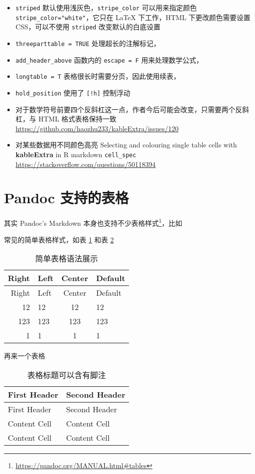 \documentclass[]{book}
\providecommand{\tightlist}{%
  \setlength{\itemsep}{0pt}\setlength{\parskip}{0pt}}
\begin{document}
\begin{itemize}
\tightlist
\item
  \texttt{striped} 默认使用浅灰色，\texttt{stripe\_color} 可以用来指定颜色 \texttt{stripe\_color="white"}，它只在 LaTeX 下工作，HTML 下更改颜色需要设置 CSS，可以不使用 \texttt{striped} 改变默认的白底设置\\
\item
  \texttt{threeparttable\ =\ TRUE} 处理超长的注解标记，
\item
  \texttt{add\_header\_above} 函数内的 \texttt{escape\ =\ F} 用来处理数学公式，
\item
  \texttt{longtable\ =\ T} 表格很长时需要分页，因此使用续表，
\item
  \texttt{hold\_position} 使用了 \texttt{{[}!h{]}} 控制浮动
\item
  对于数学符号前要四个反斜杠这一点，作者今后可能会改变，只需要两个反斜杠，与 HTML 格式表格保持一致 \url{https://github.com/haozhu233/kableExtra/issues/120}
\item
  对某些数据用不同颜色高亮
  Selecting and colouring single table cells with \textbf{kableExtra} in R markdown \texttt{cell\_spec} \url{https://stackoverflow.com/questions/50118394}
\end{itemize}

\hypertarget{pandoc-table}{%
\section{Pandoc 支持的表格}\label{pandoc-table}}

其实 Pandoc's Markdown 本身也支持不少表格样式\footnote{\url{https://pandoc.org/MANUAL.html\#tables}}，比如

常见的简单表格样式，如表 \ref{tab:simple-tab} 和表 \ref{tab:another-tab}

\begin{longtable}[]{@{}rlcl@{}}
\caption{\label{tab:simple-tab} 简单表格语法展示}\tabularnewline
\toprule
Right & Left & Center & Default\tabularnewline
\midrule
\endfirsthead
\toprule
Right & Left & Center & Default\tabularnewline
\midrule
\endhead
12 & 12 & 12 & 12\tabularnewline
123 & 123 & 123 & 123\tabularnewline
1 & 1 & 1 & 1\tabularnewline
\bottomrule
\end{longtable}

再来一个表格

\begin{longtable}[]{@{}ll@{}}
\caption[\label{tab:another-tab} 表格标题可以含有脚注]{\label{tab:another-tab} 表格标题可以含有脚注\footnotemark{}}\tabularnewline
\toprule
First Header & Second Header\tabularnewline
\midrule
\endfirsthead
\toprule
First Header & Second Header\tabularnewline
\midrule
\endhead
Content Cell & Content Cell\tabularnewline
Content Cell & Content Cell\tabularnewline
\bottomrule
\end{longtable}
\end{document}

